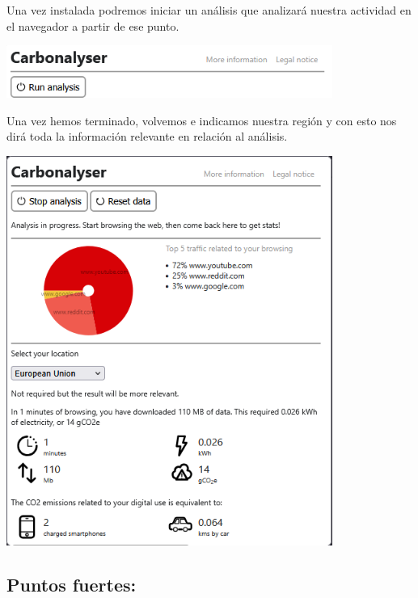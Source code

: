\documentclass[12pt,a4paper]{report}
\begin{document}
Una vez instalada podremos iniciar un análisis que analizará nuestra actividad en el navegador a partir de ese punto.

\begin{center}
  \includegraphics[width=0.8\textwidth]{imagenes/Carbonalyser_2.png}
\end{center}

Una vez hemos terminado, volvemos e indicamos nuestra región y con esto nos dirá toda la información relevante en relación al análisis.

\begin{center}
  \includegraphics[width=0.8\textwidth]{imagenes/Carbonalyser_3.png}
\end{center}

\subsection*{Puntos fuertes:}
\end{document}
